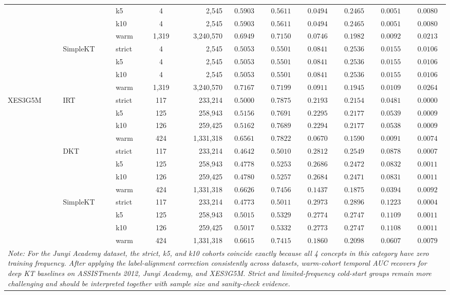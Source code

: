 \begin{table}[tbp]
{\begin{tabular}{lllcrcccccc}
 &  & k5 & 4 & 2,545 & $0.5903$ & $0.5611$ & $0.0494$ & $0.2465$ & $0.0051$ & $0.0080$ \\
 &  & k10 & 4 & 2,545 & $0.5903$ & $0.5611$ & $0.0494$ & $0.2465$ & $0.0051$ & $0.0080$ \\
 &  & warm & 1,319 & 3,240,570 & $0.6949$ & $0.7150$ & $0.0746$ & $0.1982$ & $0.0092$ & $0.0213$ \\
 & SimpleKT & strict & 4 & 2,545 & $0.5053$ & $0.5501$ & $0.0841$ & $0.2536$ & $0.0155$ & $0.0106$ \\
 &  & k5 & 4 & 2,545 & $0.5053$ & $0.5501$ & $0.0841$ & $0.2536$ & $0.0155$ & $0.0106$ \\
 &  & k10 & 4 & 2,545 & $0.5053$ & $0.5501$ & $0.0841$ & $0.2536$ & $0.0155$ & $0.0106$ \\
 &  & warm & 1,319 & 3,240,570 & $0.7167$ & $0.7199$ & $0.0911$ & $0.1945$ & $0.0109$ & $0.0264$ \\
\midrule
XES3G5M & IRT & strict & 117 & 233,214 & $0.5000$ & $0.7875$ & $0.2193$ & $0.2154$ & $0.0481$ & $0.0000$ \\
 &  & k5 & 125 & 258,943 & $0.5156$ & $0.7691$ & $0.2295$ & $0.2177$ & $0.0539$ & $0.0009$ \\
 &  & k10 & 126 & 259,425 & $0.5162$ & $0.7689$ & $0.2294$ & $0.2177$ & $0.0538$ & $0.0009$ \\
 &  & warm & 424 & 1,331,318 & $0.6561$ & $0.7822$ & $0.0670$ & $0.1590$ & $0.0091$ & $0.0074$ \\
 & DKT & strict & 117 & 233,214 & $0.4642$ & $0.5010$ & $0.2812$ & $0.2549$ & $0.0878$ & $0.0007$ \\
 &  & k5 & 125 & 258,943 & $0.4778$ & $0.5253$ & $0.2686$ & $0.2472$ & $0.0832$ & $0.0011$ \\
 &  & k10 & 126 & 259,425 & $0.4780$ & $0.5257$ & $0.2684$ & $0.2471$ & $0.0831$ & $0.0011$ \\
 &  & warm & 424 & 1,331,318 & $0.6626$ & $0.7456$ & $0.1437$ & $0.1875$ & $0.0394$ & $0.0092$ \\
 & SimpleKT & strict & 117 & 233,214 & $0.4773$ & $0.5011$ & $0.2973$ & $0.2896$ & $0.1223$ & $0.0004$ \\
 &  & k5 & 125 & 258,943 & $0.5015$ & $0.5329$ & $0.2774$ & $0.2747$ & $0.1109$ & $0.0011$ \\
 &  & k10 & 126 & 259,425 & $0.5017$ & $0.5332$ & $0.2773$ & $0.2747$ & $0.1108$ & $0.0011$ \\
 &  & warm & 424 & 1,331,318 & $0.6615$ & $0.7415$ & $0.1860$ & $0.2098$ & $0.0607$ & $0.0079$ \\
\bottomrule
\multicolumn{11}{p{8.2cm}}{\scriptsize \textit{Note: For the Junyi Academy dataset, the strict, k5, and k10 cohorts coincide exactly because all 4 concepts in this category have zero training frequency. After applying the label-alignment correction consistently across datasets, warm-cohort temporal AUC recovers for deep KT baselines on ASSISTments 2012, Junyi Academy, and XES3G5M. Strict and limited-frequency cold-start groups remain more challenging and should be interpreted together with sample size and sanity-check evidence.}} \\
\end{tabular}%
}
\end{table}
